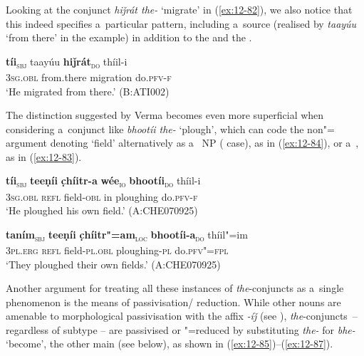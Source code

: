 Looking at the conjunct \textit{hiǰrát the-} `migrate' in (\ref{ex:12-82}), we also notice that this indeed specifies a~particular  pattern, including a~source (realised by \textit{taayúu} `from there' in the example) in addition to the  and the . 

\begin{exe}
\ex
\label{ex:12-82}
\gll {\ob}\textbf{tíi}{\cb}\textsubscript{\textsc{\upshape sbj}} taayúu {\ob}\textbf{hiǰrát}{\cb}\textsubscript{\textsc{\upshape do}} thíil-i\\
\textsc{3sg.obl} from.there migration do.\textsc{pfv-f}\\
\glt `He migrated from there.' (B:ATI002)
\end{exe}

The distinction suggested by Verma becomes even more superficial when considering a~conjunct like \textit{bhootíi the-} `plough', which can code the non"= argument denoting `field' alternatively as a~ NP ( case), as in (\ref{ex:12-84}), or a~, as in (\ref{ex:12-83}).

\begin{exe}
\ex
\label{ex:12-83}
\gll {\ob}\textbf{tíi}{\cb}\textsubscript{\textsc{\upshape sbj}} {\ob}\textbf{teeṇíi} \textbf{c̣híitr-a} \textbf{wée}{\cb}\textsubscript{\textsc{\upshape io}} {\ob}\textbf{bhootíi}{\cb}\textsubscript{\textsc{\upshape do}} thíil-i\\
\textsc{3sg.obl} \textsc{refl} field-\textsc{obl} in ploughing do.\textsc{pfv-f}\\
\glt `He ploughed his own field.' (A:CHE070925)
\end{exe}
\begin{exe}
\ex
\label{ex:12-84}
\gll {\ob}\textbf{taním}{\cb}\textsubscript{\textsc{\upshape sbj}} {\ob}\textbf{teeṇíi} \textbf{c̣híitr"=am}{\cb}\textsubscript{\textsc{\upshape loc}} {\ob}\textbf{bhootíi-a}{\cb}\textsubscript{\textsc{\upshape do}} thíil"=im\\
\textsc{3pl.erg} \textsc{refl} field-\textsc{pl.obl} ploughing-\textsc{pl} do.\textsc{pfv"=fpl} \\
\glt `They ploughed their own fields.' (A:CHE070925)
\end{exe}

Another argument for treating all these instances of \textit{the}-conjuncts as a~single phenomenon is the means of passivisation/ reduction. While other  nouns are amenable to morphological passivisation with the affix \textit{-íǰ} (see ), \textit{the}-conjuncts~-- regardless of subtype -- are passivised or "=reduced by substituting \textit{the-} for \textit{bhe-} `become', the other main  (see below), as shown in (\ref{ex:12-85})--(\ref{ex:12-87}).

